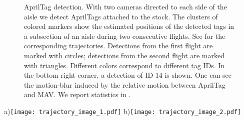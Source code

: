 \begin{figure}[t]
  \centering
  \vspace{-2em}
  \caption{AprilTag detection. With two cameras directed to each side of the aisle we detect AprilTags attached to the stock. The clusters of colored markers show the estimated positions of the detected tags in a subsection of an aisle during two consecutive flights. See  for the corresponding trajectories. Detections from the first flight are marked with circles; detections from the second flight are marked with triangles. Different colors correspond to different tag IDs. In the bottom right corner, a detection of ID 14 is shown. One can see the motion-blur induced by the relative motion between AprilTag and MAV. We report statistics in .}
  \label{fig:detections}
  \vspace{-1ex}
\end{figure}


\begin{figure*}[t]
  \centering \footnotesize
  a)\texttt{[image: trajectory\_image\_1.pdf]}%
  b)\texttt{[image: trajectory\_image\_2.pdf]}%
  \vspace{-1ex}
  \caption{Visualization of two consecutive flights in a warehouse. a) Side view, b) Top view. Despite flying in close proximity to obstacles, the MAV reaches velocities up to \SI{2.1}{\meter\per\second}. Waypoints are precisely reached without overshoot. It can be seen that the flight behavior is repeatable and that aisle changes are possible. View poses are marked with a red crossed ring. Via points that are inserted by the A* planner are marked with a red ring. Except for the manual start, the whole flight was fully autonomous.}
  \label{fig:trajectory_image}
  \vspace{-1ex}
\end{figure*}

